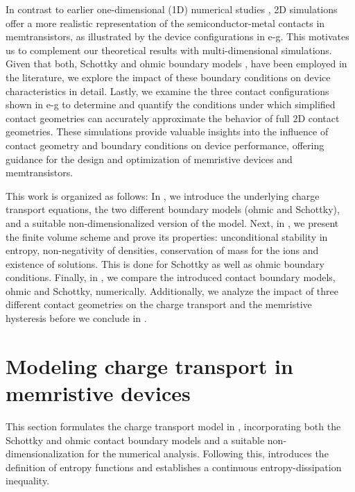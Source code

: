 \documentclass[10pt,a4paper, final]{article}
\theoremstyle{definition}								%
\numberwithin{equation}{section}
\numberwithin{figure}{section}
\numberwithin{theorem}{section}
\begin{document}
In contrast to earlier one-dimensional (1D) numerical studies \cite{Spetzler.2024,Jourdana.2023}, 2D simulations offer a more realistic representation of the semiconductor-metal contacts in memtransistors, as illustrated by the device configurations in e-g. This motivates us to complement our theoretical results with multi-dimensional simulations.
Given that both, Schottky \cite{Spetzler.2024, Sivan.2022} and ohmic boundary models \cite{Jourdana.2023, Jungel.2023, Herda.2024}, have been employed in the literature, we explore the impact of these boundary conditions on device characteristics in detail.
Lastly, we examine the three contact configurations shown in e-g to determine and quantify the conditions under which simplified contact geometries can accurately approximate the behavior of full 2D contact geometries.
These simulations provide valuable insights into the influence of contact geometry and boundary conditions on device performance, offering guidance for the design and optimization of memristive devices and memtransistors.

This work is organized as follows:
In , we introduce the underlying charge transport equations, the two different boundary models (ohmic and Schottky), and a suitable non-dimensionalized version of the model.
Next, in , we present the finite volume scheme and prove its properties: unconditional stability in entropy, non-negativity of densities, conservation of mass for the ions and existence of solutions.
This is done for Schottky as well as ohmic boundary conditions.
Finally, in , we compare the introduced contact boundary models, ohmic and Schottky, numerically.
Additionally, we analyze the impact of three different contact geometries on the charge transport and the memristive hysteresis before we conclude in .

\section{Modeling charge transport in memristive devices} \label{sec:model}

This section formulates the charge transport model in , incorporating both the Schottky and ohmic contact boundary models and a suitable non-dimensionalization for the numerical analysis.
Following this,  introduces the definition of entropy functions and establishes a continuous entropy-dissipation inequality.
\end{document}
